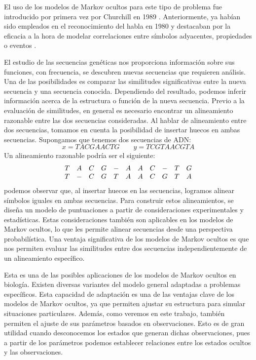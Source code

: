 El uso de los modelos de Markov ocultos para este tipo de problema fue introducido por primera vez por Churchill en 1989 \cite{Churchill}. Anteriormente, ya habían sido empleados en el reconocimiento del habla en 1980 \cite{Ferguson} y destacaban por la eficacia a la hora de modelar correlaciones entre símbolos adyacentes, propiedades o eventos \cite{Rabiner}. 

El estudio de las secuencias genéticas nos proporciona información sobre sus funciones, con frecuencia, se descubren nuevas secuencias que requieren análisis. Una de las posibilidades es comparar las similitudes significativas entre la nueva secuencia y una secuencia conocida. Dependiendo del resultado, podemos inferir información acerca de la estructura o función de la nueva secuencia. Previo a la evaluación de similitudes, en general es necesario encontrar un alineamiento razonable entre las dos secuencias consideradas. Al hablar de alineamiento entre dos secuencias, tomamos en cuenta la posibilidad de insertar huecos en ambas secuencias. Supongamos que tenemos dos secuencias de ADN: 
\[x=TACGAACTG \qquad y=TCGTAACGTA\]
Un alineamiento razonable podría ser el siguiente:
\[\begin{array}{c c c c c c c c c c c}
    T& A& C& G& -& A& A& C& -& T& G \\
    T& -& C& G& T& A& A& C& G& T& A
\end{array}\]
podemos observar que, al insertar huecos en las secuencias, logramos alinear símbolos iguales en ambas secuencias. Para construir estos alineamientos, se diseña un modelo de puntuaciones a partir de consideraciones experimentales y estadísticas. Estas consideraciones también son aplicables en los modelos de Markov ocultos, lo que les permite alinear secuencias desde una perspectiva probabilística. Una ventaja significativa de los modelos de Markov ocultos es que nos permiten evaluar las similitudes entre dos secuencias independientemente de un alineamiento específico.

Esta es una de las posibles aplicaciones de los modelos de Markov ocultos en biología. Existen diversas variantes del modelo general adaptadas a problemas específicos. Esta capacidad de adaptación es una de las ventajas clave de los modelos de Markov ocultos, ya que permiten ajustar su estructura para simular situaciones particulares. Además, como veremos en este trabajo, también permiten el ajuste de sus parámetros basados en observaciones. Esto es de gran utilidad cuando desconocemos los estados que generan dichas observaciones, pues a partir de los parámetros podemos establecer relaciones entre los estados ocultos y las observaciones.

